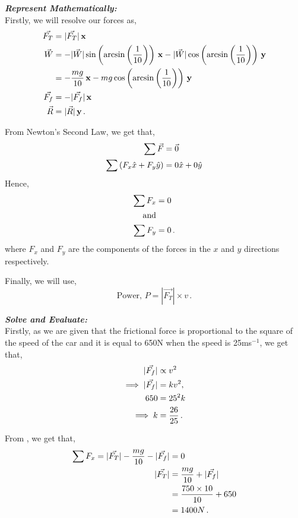 \begin{subquestions}
\textbf{\textit{Represent Mathematically:}} \\
Firstly, we will resolve our forces as, 
\begin{align}
	\vec{F_T} & = |\vec{F_T}|\,\mathbf{x} \\
	\vec{W} & = -|\vec{W}|\sin\left(\arcsin\left(\frac{1}{10}\right)\right)\,\mathbf{x} -|\vec{W}|\cos\left(\arcsin\left(\frac{1}{10}\right)\right)\,\mathbf{y} \nonumber \\
	        & = -\frac{mg}{10}\,\mathbf{x} - mg\cos\left(\arcsin\left(\frac{1}{10}\right)\right)\,\mathbf{y} \\
	\vec{F_f} & = -|\vec{F_f}|\,\mathbf{x} \\
	\vec{R} & = |\vec{R}|\,\mathbf{y} \,.
\end{align}

From Newton's Second Law, we get that,
\begin{align}
	\sum \vec{F} & = \vec{0} \nonumber \\
	\sum \left(F_x \hat{x} + F_y \hat{y}\right) &= 0 \hat{x} + 0 \hat{y} 
\end{align}
Hence,
\begin{align}
	\sum F_x & = 0 \label{2009:q5:FxEqn1} \\
	\text{and} & \nonumber \\
	\sum F_y & = 0 \,.
\end{align}
where $F_x$ and $F_y$ are the components of the forces in the $x$ and $y$ directions respectively.

Finally, we will use,
\begin{equation}
	\text{Power, }P = |\vec{F_T}|\times v \label{2009:q5:PEqn1} \,.
\end{equation}




\textbf{\textit{Solve and Evaluate:}} \\
Firstly, as we are given that the frictional force is proportional to the square of the speed of the car and it is equal to 650N when the speed is 25ms$^{-1}$, we get that,
\begin{align}
	|\vec{F_f}| & \propto v^2 \nonumber \\
	\implies |\vec{F_f}| & = kv^2, \nonumber \\
	650 & = 25^2k \nonumber \\
	\implies k & = \frac{26}{25} \,.
\end{align}

From , we get that,
\begin{align}
	\sum F_x = |\vec{F_T}|-\frac{mg}{10}-|\vec{F_f}| & = 0 \nonumber \\
	|\vec{F_T}| & = \frac{mg}{10}+|\vec{F_f}| \nonumber \\
	            & = \frac{750\times10}{10} +650 \nonumber \\
	            & = 1400N \,. \label{2009:q5:TracEqn1}
\end{align} 


\end{subquestions}
